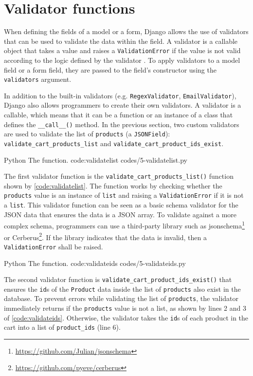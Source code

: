 \section{Validator functions}

When defining the fields of a model or a form, Django allows the use of
validators that can be used to validate the data within the field. A validator
is a callable object that takes a value and raises a \verb|ValidationError| if
the value is not valid according to the logic defined by the validator
\cite{django:validators}. To apply validators to a model field or a form field,
they are passed to the field's constructor using the \verb|validators|
argument.

In addition to the built-in validators (e.g. \verb|RegexValidator|,
\verb|EmailValidator|), Django also allows programmers to create their own
validators. A validator is a callable, which means that it can be a function or
an instance of a class that defines the \verb|__call__()| method. In the
previous section, two custom validators are used to validate the list of
\verb|products| (a \verb|JSONField|): \verb|validate_cart_products_list| and
\verb|validate_cart_product_ids_exist|.

\listing
{Python}
{The  function.}
{code:validatelist}
{codes/5-validatelist.py}

The first validator function is the \verb|validate_cart_products_list()|
function shown by \autoref{code:validatelist}. The function works by checking
whether the \verb|products| value is an instance of \verb|list| and raising a
\verb|ValidationError| if it is not a \verb|list|. This validator function can
be seen as a basic schema validator for the JSON data that ensures the data is
a JSON array. To validate against a more complex schema, programmers can use a
third-party library such as
jsonschema\footnote{\url{https://github.com/Julian/jsonschema}} or
Cerberus\footnote{\url{https://github.com/pyeve/cerberus}}. If the library
indicates that the data is invalid, then a \verb|ValidationError| shall be
raised.

\listing
{Python}
{The  function.}
{code:validateids}
{codes/5-validateids.py}

The second validator function is \verb|validate_cart_product_ids_exist()| that
ensures the \verb|id|s of the \verb|Product| data inside the list of
\verb|products| also exist in the database. To prevent errors while validating
the list of \verb|products|, the validator immediately returns if the
\verb|products| value is not a list, as shown by lines 2 and 3 of
\autoref{code:validateids}. Otherwise, the validator takes the \verb|id|s of
each product in the cart into a list of \verb|product_ids| (line 6).

